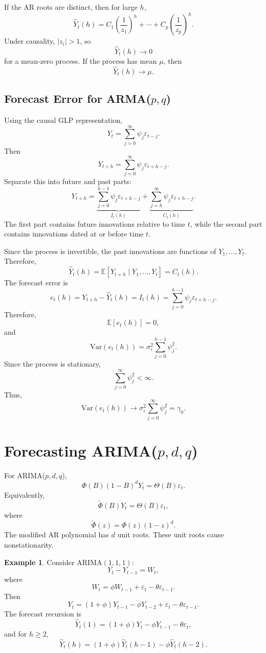 \documentclass[12pt,oneside]{book}
\numberwithin{equation}{section}
\theoremstyle{definition}
\newtheorem{example}{Example}[section]
\theoremstyle{plain}
\theoremstyle{remark}
\newcommand{\E}{\mathbb{E}}
\newcommand{\Var}{\mathrm{Var}}
\begin{document}
If the AR roots are distinct, then for large $h$,
\[
\widehat{Y}_t(h)
=
C_1\left(\frac{1}{z_1}\right)^h
+\cdots+
C_p\left(\frac{1}{z_p}\right)^h.
\]
Under causality, $|z_i|>1$, so
\[
\widehat{Y}_t(h)\to 0
\]
for a mean-zero process. If the process has mean $\mu$, then
\[
\widehat{Y}_t(h)\to \mu.
\]

\subsection{Forecast Error for ARMA($p,q$)}

Using the causal GLP representation,
\[
Y_t=\sum_{j=0}^{\infty}\psi_j\varepsilon_{t-j}.
\]
Then
\[
Y_{t+h}
=
\sum_{j=0}^{\infty}\psi_j\varepsilon_{t+h-j}.
\]
Separate this into future and past parts:
\[
Y_{t+h}
=
\underbrace{\sum_{j=0}^{h-1}\psi_j\varepsilon_{t+h-j}}_{I_t(h)}
+
\underbrace{\sum_{j=h}^{\infty}\psi_j\varepsilon_{t+h-j}}_{C_t(h)}.
\]
The first part contains future innovations relative to time $t$, while the second part contains innovations dated at or before time $t$.

Since the process is invertible, the past innovations are functions of $Y_1,\ldots,Y_t$. Therefore,
\[
\widehat{Y}_t(h)
=
\E[Y_{t+h}\mid Y_1,\ldots,Y_t]
=
C_t(h).
\]
The forecast error is
\[
e_t(h)
=
Y_{t+h}-\widehat{Y}_t(h)
=
I_t(h)
=
\sum_{j=0}^{h-1}\psi_j\varepsilon_{t+h-j}.
\]
Therefore,
\[
\E[e_t(h)]=0,
\]
and
\[
\Var(e_t(h))
=
\sigma_\varepsilon^2
\sum_{j=0}^{h-1}\psi_j^2.
\]
Since the process is stationary,
\[
\sum_{j=0}^{\infty}\psi_j^2<\infty.
\]
Thus,
\[
\Var(e_t(h))
\to
\sigma_\varepsilon^2
\sum_{j=0}^{\infty}\psi_j^2
=
\gamma_0.
\]

\section{Forecasting ARIMA($p,d,q$)}

For ARIMA($p,d,q$),
\[
\Phi(B)(1-B)^dY_t=\Theta(B)\varepsilon_t.
\]
Equivalently,
\[
\widetilde{\Phi}(B)Y_t=\Theta(B)\varepsilon_t,
\]
where
\[
\widetilde{\Phi}(z)=\Phi(z)(1-z)^d.
\]
The modified AR polynomial has $d$ unit roots. These unit roots cause nonstationarity.

\begin{example}
Consider ARIMA$(1,1,1)$:
\[
Y_t-Y_{t-1}=W_t,
\]
where
\[
W_t=\phi W_{t-1}+\varepsilon_t-\theta\varepsilon_{t-1}.
\]
Then
\[
Y_t=(1+\phi)Y_{t-1}-\phi Y_{t-2}+\varepsilon_t-\theta\varepsilon_{t-1}.
\]
The forecast recursion is
\[
\widehat{Y}_t(1)
=
(1+\phi)Y_t-\phi Y_{t-1}-\theta\varepsilon_t,
\]
and for $h\geq 2$,
\[
\widehat{Y}_t(h)
=
(1+\phi)\widehat{Y}_t(h-1)-\phi\widehat{Y}_t(h-2).
\]
\end{example}
\end{document}
